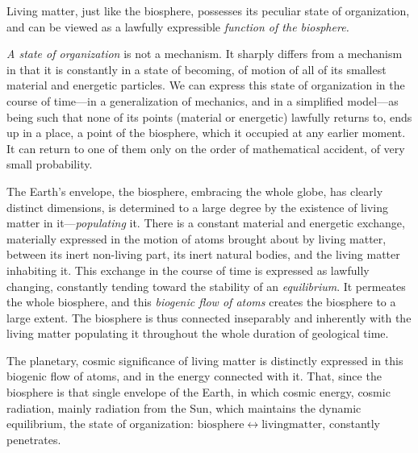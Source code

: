 Living matter, just like the biosphere, possesses its peculiar state of
organization, and can be viewed as a lawfully expressible \emph{function of the
biosphere.}

\emph{A state of organization} is not a mechanism.  It sharply differs from a
mechanism in that it is constantly in a state of
becoming, of motion of all of its smallest material and energetic particles.  We can
express this state of organization in the course of time---in a generalization
of mechanics, and in a simplified model---as being such that none of its points
(material or energetic) lawfully returns to,  ends up in a place,  a point of the biosphere, which it
occupied at any earlier moment.  It can return to one of them only on the order
of mathematical accident, of very small probability.

The Earth's envelope, the biosphere, embracing the whole globe, has clearly
distinct dimensions,  is determined to a large degree by the
existence of living matter in it---\emph{populating} it.
There is a constant material and energetic exchange, materially expressed in
the motion of atoms brought about by living matter, between its inert
non-living part, its inert natural bodies, and the living matter inhabiting it.
This exchange in the course of time is expressed as lawfully changing,
constantly tending toward the stability of an
\emph{equilibrium}.  It permeates the whole biosphere,
and this \emph{biogenic flow of atoms}
creates the biosphere to a large extent.  The biosphere is thus connected
inseparably and inherently with the living matter populating it throughout the
whole duration of geological time.

The planetary, cosmic significance of living matter is distinctly expressed in
this biogenic flow of atoms, and in the energy connected with it.  That, since
the biosphere is that single envelope of the Earth, in which cosmic energy,
cosmic radiation, mainly radiation from the Sun, which maintains the dynamic
equilibrium, the state of organization: $\mathrm{biosphere} \leftrightarrow
\mathrm{living matter}$, constantly penetrates.

